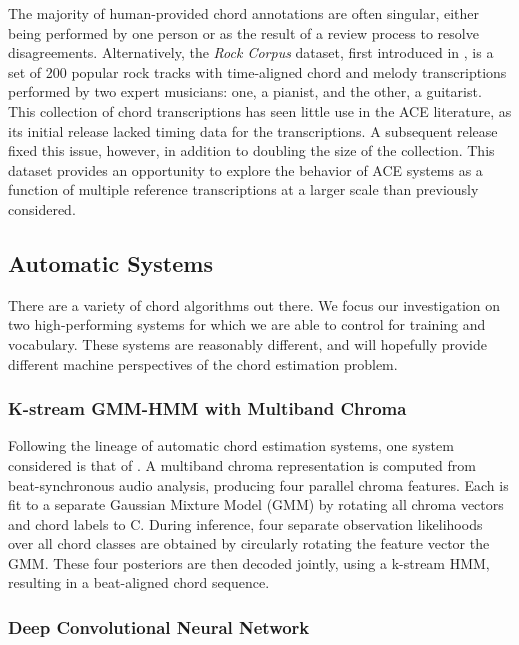 \documentclass{article}
\begin{document}
The majority of human-provided chord annotations are often singular, either being performed by one person or as the result of a review process to resolve disagreements.
Alternatively, the \emph{Rock Corpus} dataset, first introduced in \cite{deClercq2011Corpus}, is a set of 200 popular rock tracks with time-aligned chord and melody transcriptions performed by two expert musicians:
one, a pianist, and the other, a guitarist.
This collection of chord transcriptions has seen little use in the ACE literature, as its initial release lacked timing data for the transcriptions.
A subsequent release fixed this issue, however, in addition to doubling the size of the collection.
This dataset provides an opportunity to explore the behavior of ACE systems as a function of multiple reference transcriptions at a larger scale than previously considered.


\subsection{Automatic Systems}
\label{subsec:systems}

There are a variety of chord algorithms out there.
We focus our investigation on two high-performing systems for which we are able to control for training and vocabulary.
These systems are reasonably different, and will hopefully provide different machine perspectives of the chord estimation problem.


\subsubsection{K-stream GMM-HMM with Multiband Chroma}

Following the lineage of automatic chord estimation systems, one system considered is that of \cite{Cho2014Improved}.
A multiband chroma representation is computed from beat-synchronous audio analysis, producing four parallel chroma features.
Each is fit to a separate Gaussian Mixture Model (GMM) by rotating all chroma vectors and chord labels to C.
During inference, four separate observation likelihoods over all chord classes are obtained by circularly rotating the feature vector the GMM.
These four posteriors are then decoded jointly, using a k-stream HMM, resulting in a beat-aligned chord sequence.


\subsubsection{Deep Convolutional Neural Network}
\end{document}
